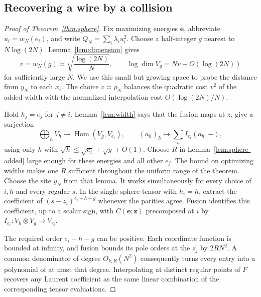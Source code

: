 \subsection{Recovering a wire by a collision}

\begin{proof}[Proof of Theorem~\ref{thm:sphere}]
Fix maximizing energies \(\mathbf e\), abbreviate \(u_i=w_N(e_i)\),
and write \(Q_N=\sum_i\lambda_i u_i^2\). Choose a half-integer
\(g\) nearest to \(N\log(2N)\). Lemma~\ref{lem:dimension} gives
\begin{equation}\label{eq:sphere-testwidth}
 v=w_N(g)\asymp\sqrt{\frac{\log(2N)}{N}},
 \qquad
 \log\dim V_g=Nv-O(\log(2N))
\end{equation}
for sufficiently large \(N\). We use this small but growing space to
probe the distance from \(y_N\) to each \(x_i\). The choice
\(v\asymp\rho_N\) balances the quadratic cost \(v^2\) of the added width
with the normalized interpolation cost \(O(\log(2N)/N)\).

Hold \(h_j=e_j\) for \(j\ne i\). Lemma~\ref{lem:width} says that the
fusion maps at \(z_i\) give a surjection
\begin{equation}\label{eq:sphere-surjection}
 \bigoplus_h V_h\longrightarrow\operatorname{Hom}(V_g,V_{e_i}),
 \qquad (a_h)_h\longmapsto\sum_h I_{e_i}(a_h,-),
\end{equation}
using only \(h\) with \(\sqrt h\le\sqrt{e_i}+\sqrt g+O(1)\).
Choose \(R\) in Lemma~\ref{lem:sphere-added} large enough for these
energies and all other \(e_j\). The bound on optimizing widths makes
one \(R\) sufficient throughout the uniform range of the theorem.
Choose the site \(y_N\) from that lemma. It works simultaneously
for every choice of \(i,h\) and every regular \(s\). In the single
sphere tensor with \(h_i=h\), extract the coefficient of
\((s-z_i)^{e_i-h-g}\) whenever the parities agree. Fusion identifies
this coefficient, up to a scalar sign, with \(C(\mathbf e;\mathbf z)\)
precomposed at \(i\) by \(I_{e_i}:V_h\otimes V_g\to V_{e_i}\).

The required order \(e_i-h-g\) can be positive. Each coordinate
function is bounded at infinity, and fusion bounds its pole
orders at the \(z_j\) by \(2RN^2\). A common denominator of degree
\(O_{k,R}(N^2)\) consequently turns every entry into a polynomial of
at most that degree. Interpolating at distinct regular points of \(F\)
recovers any Laurent coefficient as the same linear combination of
the corresponding tensor evaluations.


\end{proof}
